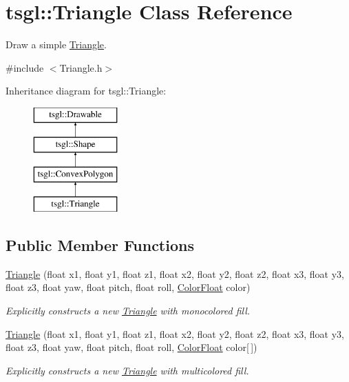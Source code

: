 \hypertarget{classtsgl_1_1_triangle}{}\section{tsgl\+:\+:Triangle Class Reference}
\label{classtsgl_1_1_triangle}


Draw a simple \hyperlink{classtsgl_1_1_triangle}{Triangle}.  




{\ttfamily \#include $<$Triangle.\+h$>$}

Inheritance diagram for tsgl\+:\+:Triangle\+:\begin{figure}[H]
\begin{center}
\leavevmode
\includegraphics[height=4.000000cm]{classtsgl_1_1_triangle}
\end{center}
\end{figure}
\subsection*{Public Member Functions}
\begin{DoxyCompactItemize}
\item 
\hyperlink{classtsgl_1_1_triangle_a810340db0727581a93729cc889ba5c29}{Triangle} (float x1, float y1, float z1, float x2, float y2, float z2, float x3, float y3, float z3, float yaw, float pitch, float roll, \hyperlink{structtsgl_1_1_color_float}{Color\+Float} color)
\begin{DoxyCompactList}\small\item\em Explicitly constructs a new \hyperlink{classtsgl_1_1_triangle}{Triangle} with monocolored fill. \end{DoxyCompactList}\item 
\hyperlink{classtsgl_1_1_triangle_ac75a40e68626d5970b10de4ce4c3db06}{Triangle} (float x1, float y1, float z1, float x2, float y2, float z2, float x3, float y3, float z3, float yaw, float pitch, float roll, \hyperlink{structtsgl_1_1_color_float}{Color\+Float} color\mbox{[}$\,$\mbox{]})
\begin{DoxyCompactList}\small\item\em Explicitly constructs a new \hyperlink{classtsgl_1_1_triangle}{Triangle} with multicolored fill. \end{DoxyCompactList}\end{DoxyCompactItemize}
